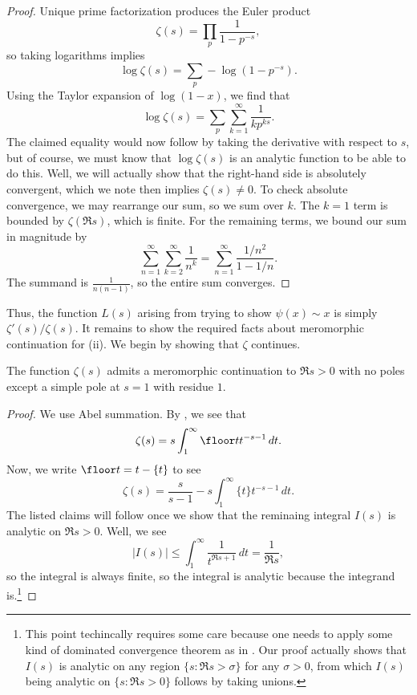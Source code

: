 \documentclass[../thesis.tex]{subfiles}
\begin{document}
\begin{proof}
	Unique prime factorization produces the Euler product
	\[\zeta(s)=\prod_p\frac1{1-p^{-s}},\]
	so taking logarithms implies
	\[\log\zeta(s)=\sum_p-\log\left(1-p^{-s}\right).\]
	Using the Taylor expansion of $\log(1-x)$, we find that
	\[\log\zeta(s)=\sum_p\sum_{k=1}^\infty\frac{1}{kp^{ks}}.\]
	The claimed equality would now follow by taking the derivative with respect to $s$, but of course, we must know that $\log\zeta(s)$ is an analytic function to be able to do this. Well, we will actually show that the right-hand side is absolutely convergent, which we note then implies $\zeta(s)\ne0$. To check absolute convergence, we may rearrange our sum, so we sum over $k$. The $k=1$ term is bounded by $\zeta(\Re s)$, which is finite. For the remaining terms, we bound our sum in magnitude by
	\[\sum_{n=1}^\infty\sum_{k=2}^\infty\frac1{n^{k}}=\sum_{n=1}^\infty\frac{1/n^2}{1-1/n}.\]
	The summand is $\frac1{n(n-1)}$, so the entire sum converges.
\end{proof}
Thus, the function $L(s)$ arising from trying to show $\psi(x)\sim x$ is simply $\zeta'(s)/\zeta(s)$. It remains to show the required facts about meromorphic continuation for (ii). We begin by showing that $\zeta$ continues.
\begin{lemma} \label{lem:zeta-meromorphic-continue}
	The function $\zeta(s)$ admits a meromorphic continuation to $\Re s>0$ with no poles except a simple pole at $s=1$ with residue $1$.
\end{lemma}
\begin{proof}
	We use Abel summation. By , we see that
	\[\zeta(s)=s\int_1^\infty\floor tt^{-s-1}\,dt.\]
	Now, we write $\floor t=t-\{t\}$ to see
	\[\zeta(s)=\frac s{s-1}-s\int_1^\infty\{t\}t^{-s-1}\,dt.\]
	The listed claims will follow once we show that the reminaing integral $I(s)$ is analytic on $\Re s>0$. Well, we see
	\[\left|I(s)\right|\le\int_1^\infty\frac{1}{t^{\Re s+1}}\,dt=\frac1{\Re s},\]
	so the integral is always finite, so the integral is analytic because the integrand is.\footnote{This point techincally requires some care because one needs to apply some kind of dominated convergence theorem as in \cite{mattner-diff-under-integral}. Our proof actually shows that $I(s)$ is analytic on any region $\{s:\Re s>\sigma\}$ for any $\sigma>0$, from which $I(s)$ being analytic on $\{s:\Re s>0\}$ follows by taking unions.}
\end{proof}
\end{document}
